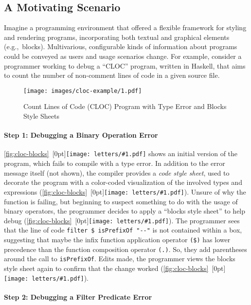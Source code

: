 \documentclass[acmsmall, screen]{acmart}
\newcommand{\parahead}[1]
  {\paragraph{\textbf{#1}}}
\newcommand{\figBubble}[1]{\raisebox{-0.03in}[0pt]{\texttt{[image: letters/\#1.pdf]}}}
\newcommand{\refBubble}[1]
  {~\figBubble{#1}}
\begin{document}
\subsection{A Motivating Scenario}

Imagine a programming environment that offered a flexible framework for styling and rendering programs, incorporating both textual and graphical elements (e.g.,~blocks).
Multivarious, configurable kinds of information about programs could be conveyed as users and usage scenarios change.
For example, consider a programmer working to debug a ``CLOC'' program, written in Haskell, that aims to count the number of non-comment lines of code in a given source file.

\newcommand{\prefixOp}[1]{\texttt{(#1)}}
\newcommand{\bindOp}{\texttt{>\hspace{0in}>=}}
\newcommand{\lrComposeOp}{\texttt{>\hspace{0in}>\hspace{0in}>}}

\begin{figure}[b] \texttt{[image: images/cloc-example/1.pdf]}
  \caption{Count Lines of Code (CLOC) Program with Type Error and Blocks Style Sheets}
  \label{fig:cloc-blocks}
\end{figure}
 
\parahead{Step 1: Debugging a Binary Operation Error}

\autoref{fig:cloc-blocks}\refBubble{a} shows an initial version of the program, which fails to compile with a type error.
In addition to the error message itself (not shown), the compiler provides a \textit{code style sheet}, used to decorate the program with a color-coded visualization of the involved types and expressions (\autoref{fig:cloc-blocks}\refBubble{b}).
Unsure of why the function is failing, but beginning to suspect something to do with the usage of binary operators, the programmer decides to apply a ``blocks style sheet'' to help debug (\autoref{fig:cloc-blocks}\refBubble{c}).
The programmer sees that the line of code \texttt{filter \$ isPrefixOf "-}\texttt{-"} is not contained within a box, suggesting that maybe the infix function application operator \texttt{(\$)} has lower precedence than the function composition operator \texttt{(.)}. So, they add parentheses around the call to \texttt{isPrefixOf}.
Edits made, the programmer views the blocks style sheet again to confirm that the change worked (\autoref{fig:cloc-blocks}\refBubble{d}).

\parahead{Step 2: Debugging a Filter Predicate Error}
\end{document}
